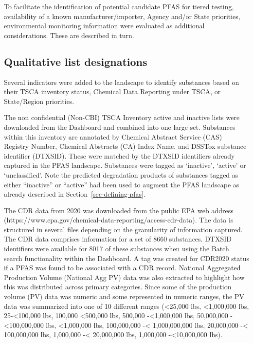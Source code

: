 \documentclass[
  super,
  preprint,
  3p]{elsarticle}
\begin{document}
To facilitate the identification of potential candidate PFAS for tiered
testing, availability of a known manufacturer/importer, Agency and/or
State priorities, environmental monitoring information were evaluated as
additional considerations. These are described in turn.

\hypertarget{sec-lists}{%
\subsection{Qualitative list designations}\label{sec-lists}}

Several indicators were added to the landscape to identify substances
based on their TSCA inventory status, Chemical Data Reporting under
TSCA, or State/Region priorities.

The non confidential (Non-CBI) TSCA Inventory active and inactive lists
were downloaded from the Dashboard and combined into one large set.
Substances within this inventory are annotated by Chemical Abstract
Service (CAS) Registry Number, Chemical Abstracts (CA) Index Name, and
DSSTox substance identifier (DTXSID). These were matched by the DTXSID
identifiers already captured in the PFAS landscape. Substances were
tagged as `inactive', `active' or `unclassified'. Note the predicted
degradation products of substances tagged as either ``inactive'' or
``active'' had been used to augment the PFAS landscape as already
described in Section~\ref{sec-defining-pfas}.

The CDR data from 2020 was downloaded from the public EPA web address
(https://www.epa.gov/chemical-data-reporting/access-cdr-data). The data
is structured in several files depending on the granularity of
information captured. The CDR data comprises information for a set of
8660 substances. DTXSID identifiers were available for 8017 of these
substances when using the Batch search functionality within the
Dashboard. A tag was created for CDR2020 status if a PFAS was found to
be associated with a CDR record. National Aggregated Production Volume
(National Agg PV) data was also extracted to highlight how this was
distributed across primary categories. Since some of the production
volume (PV) data was numeric and some represented in numeric ranges, the
PV data was summarized into one of 10 different ranges (\textless25,000
lbs, \textless1,000,000 lbs, 25-\textless100,000 lbs, 100,000
\textless500,000 lbs, 500,000 -\textless1,000,000 lbs, 50,000,000
-\textless100,000,000 lbs, \textless1,000,000 lbs, 100,000,000
-\textless{} 1,000,000,000 lbs, 20,000,000 -\textless{} 100,000,000 lbs,
1,000,000 -\textless{} 20,000,000 lbs, 1,000,000 -\textless10,000,000
lbs).\\
\end{document}
